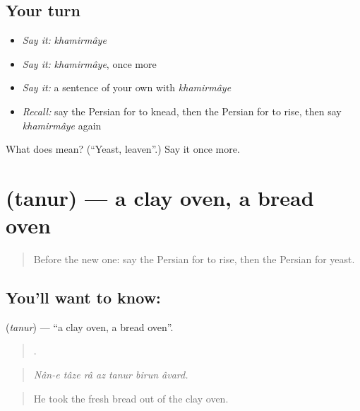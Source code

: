 \subsection*{Your turn}
\begin{itemize}
\raggedright
  \item \emph{Say it:} \emph{khamirmâye}
  \item \emph{Say it:} \emph{khamirmâye}, once more
  \item \emph{Say it:} a sentence of your own with \emph{khamirmâye}
  \item \emph{Recall:} say the Persian for to knead, then the Persian for to rise, then say \emph{khamirmâye} again
\end{itemize}

\begin{tcolorbox}[breakable,colback=teal!4,colframe=teal!35!black,title={Before you move on}]
What does  mean? (\textquotedblleft{}Yeast, leaven\textquotedblright{}.) Say it once more.
\end{tcolorbox}
\section[\texorpdfstring{\fa{تنور} (tanur)}{تنور (tanur)}]{ (tanur) — a clay oven, a bread oven}

\label{lesson:FA-C357-tanur}



\begin{quote}
Before the new one: say the Persian for to rise, then the Persian for yeast.
\end{quote}

\subsection*{You'll want to know: }
\textbf{} (\emph{tanur}) — \textquotedblleft{}a clay oven, a bread oven\textquotedblright{}.

\begin{quote}
      .
\end{quote}

\begin{quote}
\emph{Nân-e tâze râ az tanur birun âvard.}
\end{quote}

\begin{quote}
He took the fresh bread out of the clay oven.
\end{quote}

